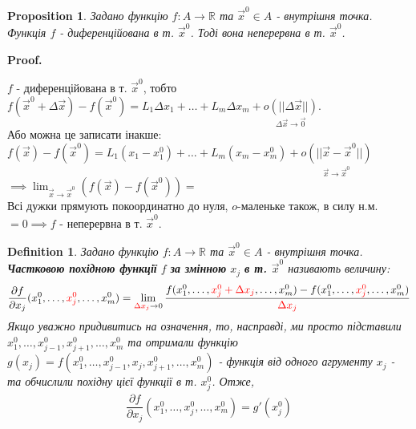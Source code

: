 \documentclass[a4paper, 10pt]{article}
\makeatletter
\def\departial#1#2{\dfrac{\partial {#1}}{\partial {#2}}}
\def\huge{\displaystyle}
\def\qed{$\blacksquare$}
\theoremstyle{theoremdd}
\theoremstyle{theoremdd}
\newtheorem{definition}[theorem]{Definition}
\theoremstyle{theoremdd}
\theoremstyle{theoremdd}
\theoremstyle{theoremdd}
\newtheorem{proposition}[theorem]{Proposition}
\theoremstyle{theoremdd}
\theoremstyle{theoremdd}
\theoremstyle{theoremdd}
\renewenvironment{proof}[1][Proof.\\]{\par
\pushQED{\hfill \qed}%
\normalfont \topsep6\p@\@plus6\p@\relax
\trivlist
\item\relax
{\bfseries
#1\@addpunct{.}}\hspace\labelsep\ignorespaces
}{%
\popQED\endtrivlist\@endpefalse
}
\makeatother
\begin{document}
\begin{proposition}
Задано функцію $f: A \to \mathbb{R}$ та $\vec{x}^0 \in A$ - внутрішня точка.\\
Функція $f$ - диференційована в т. $\vec{x}^0$. Тоді вона неперервна в т. $\vec{x}^0$.
\end{proposition}
\begin{proof}
$f$ - диференційована в т. $\vec{x}^0$, тобто
$f(\vec{x}^0 + \Delta \vec{x}) - f(\vec{x}^0) = L_1 \Delta x_1 + \dots + L_m \Delta x_m + \underset{\Delta \vec{x} \to \vec{0}}{o(||\Delta \vec{x}||)}$.\\
Або можна це записати інакше:\\
$f(\vec{x}) - f(\vec{x}^0) = L_1(x_1 - x_1^0) + \dots + L_m(x_m - x_m^0) + \underset{\vec{x} \to \vec{x}^0}{o(||\vec{x}-\vec{x}^0||)}$
$\implies \huge \lim_{\vec{x} \to \vec{x}^0} (f(\vec{x}) - f(\vec{x}^0)) \boxed{=}$\\
Всі дужки прямують покоординатно до нуля, $o$-маленьке також, в силу н.м. \\
$\boxed{=} 0 \implies f$ - неперервна в т. $\vec{x}^0$.
\end{proof}

\begin{definition}
Задано функцію $f: A \to \mathbb{R}$ та $\vec{x}^0 \in A$ - внутрішня точка.\\
\textbf{Частковою похідною функції} $f$ \textbf{за змінною} $x_j$ \textbf{в т. $\vec{x}^0$} називають величину:
\begin{align*}
\dfrac{\partial f}{\partial x_j} (x_1^0, \dots, \textcolor{red}{x_j^0}, \dots, x_m^0) = \huge \lim_{\textcolor{red}{\Delta x_j} \to 0} \dfrac{f(x_1^0,\dots,\textcolor{red}{x_j^0 + \Delta x_j}, \dots, x_m^0) - f(x_1^0,\dots,\textcolor{red}{x_j^0}, \dots, x_m^0)}{\textcolor{red}{\Delta x_j}}
\end{align*}
Якщо уважно придивитись на означення, то, насправді, ми просто підставили $x_1^0,\dots,x_{j-1}^0,x_{j+1}^0,\dots,x_m^0$ та отримали функцію $g(x_j) = f(x_1^0,\dots,x_{j-1}^0,x_j,x_{j+1}^0,\dots, x_m^0)$ - функція від одного агрументу $x_j$ - та обчислили похідну цієї функції в т. $x_j^0$. Отже,
\begin{align*}
\departial{f}{x_j}(x_1^0,\dots,x_j^0,\dots,x_m^0) = g'(x_j^0)
\end{align*}
\end{definition}
\end{document}
